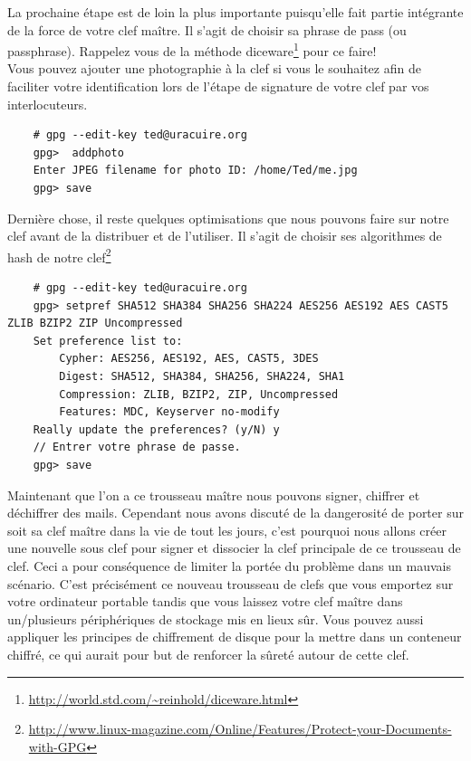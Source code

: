 \documentclass[a4paper]{article}
\begin{document}
La prochaine étape est de loin la plus importante puisqu'elle fait partie
intégrante de la force de votre clef maître. Il s'agit de choisir sa phrase
de pass (ou passphrase). Rappelez vous de la méthode
diceware\protect\footnote{\url{http://world.std.com/~reinhold/diceware.html}} %
pour ce faire!
\\
Vous pouvez ajouter une photographie à la clef si vous le souhaitez afin de
faciliter votre identification lors de l'étape de signature de votre clef par
vos interlocuteurs.

\begin{verbatim}
    # gpg --edit-key ted@uracuire.org
    gpg>  addphoto
    Enter JPEG filename for photo ID: /home/Ted/me.jpg
    gpg> save
\end{verbatim}

Dernière chose, il reste quelques optimisations que nous pouvons faire sur
notre clef avant de la distribuer et de l'utiliser. Il s'agit de choisir ses
algorithmes de hash de notre
clef\protect\footnote{\url{http://www.linux-magazine.com/Online/Features/Protect-your-Documents-with-GPG}}

\begin{verbatim}
    # gpg --edit-key ted@uracuire.org
    gpg> setpref SHA512 SHA384 SHA256 SHA224 AES256 AES192 AES CAST5 ZLIB BZIP2 ZIP Uncompressed
    Set preference list to:
        Cypher: AES256, AES192, AES, CAST5, 3DES
        Digest: SHA512, SHA384, SHA256, SHA224, SHA1
        Compression: ZLIB, BZIP2, ZIP, Uncompressed
        Features: MDC, Keyserver no-modify
    Really update the preferences? (y/N) y
    // Entrer votre phrase de passe.
    gpg> save
\end{verbatim}

Maintenant que l'on a ce trousseau maître nous pouvons signer, chiffrer et
déchiffrer des mails. Cependant nous avons discuté de la dangerosité de porter
sur soit sa clef maître dans la vie de tout les jours, c'est pourquoi nous
allons créer une nouvelle sous clef pour signer et dissocier la clef principale
de ce trousseau de clef. Ceci a pour conséquence de limiter la portée du
problème dans un mauvais scénario. C'est précisément ce nouveau trousseau de
clefs que vous emportez sur votre ordinateur portable tandis que vous laissez
votre clef maître dans un/plusieurs périphériques de stockage mis en lieux sûr.
Vous pouvez aussi appliquer les principes de chiffrement de disque pour la
mettre dans un conteneur chiffré, ce qui aurait pour but de renforcer la
sûreté autour de cette clef.
\end{document}
